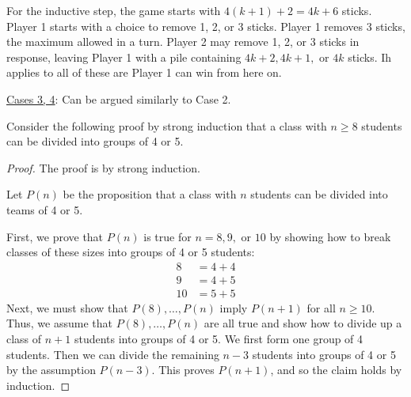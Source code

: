 \documentclass[a4paper]{exam}
\begin{document}
\begin{questions}
\begin{solution}
    For the inductive step, the game starts with $4(k+1) + 2=4k+6$ sticks. Player 1 starts with a choice to remove 1, 2, or 3 sticks. Player 1 removes 3 sticks, the maximum allowed in a turn. Player 2 may remove 1, 2, or 3 sticks in response, leaving Player 1 with a pile containing  $4k+2, 4k+1,$ or $4k$ sticks. Ih applies to all of these are Player 1 can win from here on.

    \underline{Cases 3, 4}: Can be argued similarly to Case 2.
    
  \end{solution}
  
  \question 
  Consider the following proof by strong induction that a class with \( n \geq 8 \) students can be divided into groups of 4 or 5.

  \begin{mdframed}
    \begin{proof} The proof is by strong induction.

      Let \( P(n) \) be the proposition that a class with \( n \) students can be divided into teams of 4 or 5.

      First, we prove that \( P(n) \) is true for \( n = 8, 9, \) or \( 10 \) by showing how to break classes of these sizes into groups of 4 or 5 students:
      \begin{align*}
8  &= 4 + 4 \\
9  &= 4 + 5 \\
10 &= 5 + 5 
      \end{align*}
Next, we must show that \( P(8), \ldots, P(n) \) imply \( P(n + 1) \) for all \( n \geq 10 \). Thus, we assume that \( P(8), \ldots, P(n) \) are all true and show how to divide up a class of \( n + 1 \) students into groups of 4 or 5. We first form one group of 4 students. Then we can divide the remaining \( n-3 \) students into groups of 4 or 5 by the assumption \( P(n-3) \). This proves \( P(n+1) \), and so the claim holds by induction.
\end{proof}
\end{mdframed}

\end{questions}
\end{document}
